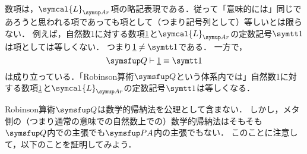 \begin{Note}
	数項は，\(\symcal{L}_{\Ar}\)項の略記表現である．従って「意味的には」同じであろうと思われる項であっても項として（つまり記号列として）等しいとは限らない．
	例えば，自然数1に対する数項\(\underline{1}\)と\(\symcal{L}_{\Ar}\)の定数記号\(\obj{1}\)は項としては等しくない．
	つまり\(\numeral{1} \neq \obj{1}\)である．
	一方で，
	\begin{equation}
		\Robinson \provable \numeral{1} \objeq \obj{1}
		\label{eq:robinson1numeric}
	\end{equation}
	は成り立っている．「Robinson算術\(\Robinson\)という体系内では」自然数1に対する数項\(\underline{1}\)と\(\symcal{L}_{\Ar}\)の定数記号\(\obj{1}\)は等しくなる．
\end{Note}


Robinson算術\(\Robinson\)は数学的帰納法を公理として含まない．
しかし，メタ側の（つまり通常の意味での自然数上での）数学的帰納法はそもそも\(\Robinson\)内での主張でも\(\PA\)内の主張でもない．
このことに注意して，以下のことを証明してみよう．

